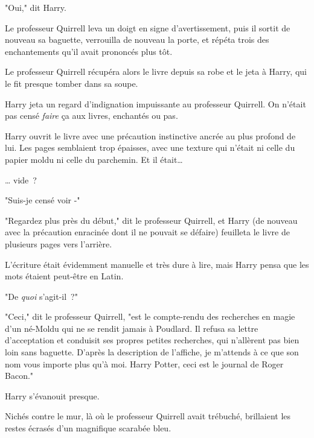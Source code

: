 "Oui," dit Harry.

Le professeur Quirrell leva un doigt en signe d'avertissement, puis il sortit de nouveau sa baguette, verrouilla de nouveau la porte, et répéta trois des enchantements qu'il avait prononcés plus tôt.

Le professeur Quirrell récupéra alors le livre depuis sa robe et le jeta à Harry, qui le fit presque tomber dans sa soupe.

Harry jeta un regard d'indignation impuissante au professeur Quirrell. On n'était pas censé \emph{faire} ça aux livres, enchantés ou pas.

Harry ouvrit le livre avec une précaution instinctive ancrée au plus profond de lui. Les pages semblaient trop épaisses, avec une texture qui n'était ni celle du papier moldu ni celle du parchemin. Et il était…

… vide~?

"Suis-je censé voir -"

"Regardez plus près du début," dit le professeur Quirrell, et Harry (de nouveau avec la précaution enracinée dont il ne pouvait se défaire) feuilleta le livre de plusieurs pages vers l'arrière.

L'écriture était évidemment manuelle et très dure à lire, mais Harry pensa que les mots étaient peut-être en Latin.

"De \emph{quoi} s'agit-il~?"

"Ceci," dit le professeur Quirrell, "est le compte-rendu des recherches en magie d'un né-Moldu qui ne se rendit jamais à Poudlard. Il refusa sa lettre d'acceptation et conduisit ses propres petites recherches, qui n'allèrent pas bien loin sans baguette. D'après la description de l'affiche, je m'attends à ce que son nom vous importe plus qu'à moi. Harry Potter, ceci est le journal de Roger Bacon."

Harry s'évanouit presque.

Nichés contre le mur, là où le professeur Quirrell avait trébuché, brillaient les restes écrasés d'un magnifique scarabée bleu. 


